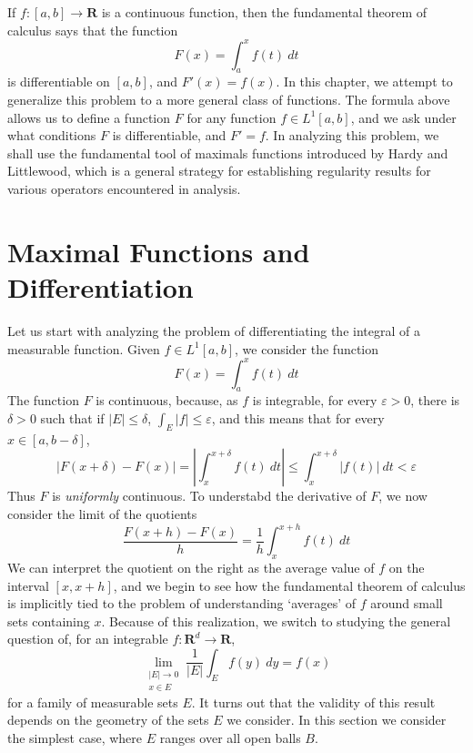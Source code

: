 %
%

If $f: [a,b] \to \mathbf{R}$ is a continuous function, then the fundamental theorem of calculus says that the function
%
\[ F(x) = \int_a^x f(t)\ dt \]
%
is differentiable on $[a,b]$, and $F'(x) = f(x)$. In this chapter, we attempt to generalize this problem to a more general class of functions. The formula above allows us to define a function $F$ for any function $f \in L^1[a,b]$, and we ask under what conditions $F$ is differentiable, and $F' = f$. In analyzing this problem, we shall use the fundamental tool of maximals functions introduced by Hardy and Littlewood, which is a general strategy for establishing regularity results for various operators encountered in analysis.

\section{Maximal Functions and Differentiation}

Let us start with analyzing the problem of differentiating the integral of a measurable function. Given $f \in L^1[a,b]$, we consider the function
%
\[ F(x) = \int_a^x f(t)\ dt \]
%
The function $F$ is continuous, because, as $f$ is integrable, for every $\varepsilon > 0$, there is $\delta > 0$ such that if $|E| \leq \delta$, $\int_E |f| \leq \varepsilon$, and this means that for every $x \in [a,b-\delta]$,
%
\[ |F(x + \delta) - F(x)| = \left| \int_{x}^{x+\delta} f(t)\ dt \right| \leq \int_x^{x+\delta} |f(t)|\ dt < \varepsilon \]
%
Thus $F$ is {\it uniformly} continuous. To understabd the derivative of $F$, we now consider the limit of the quotients
%
\[ \frac{F(x+h) - F(x)}{h} = \frac{1}{h} \int_x^{x+h} f(t)\ dt \]
%
We can interpret the quotient on the right as the average value of $f$ on the interval $[x,x+h]$, and we begin to see how the fundamental theorem of calculus is implicitly tied to the problem of understanding `averages' of $f$ around small sets containing $x$. Because of this realization, we switch to studying the general question of, for an integrable $f: \mathbf{R}^d \to \mathbf{R}$,
%
\[ \lim_{\substack{|E| \to 0\\x \in E}} \frac{1}{|E|} \int_E f(y)\ dy = f(x) \]
%
for a family of measurable sets $E$. It turns out that the validity of this result depends on the geometry of the sets $E$ we consider. In this section we consider the simplest case, where $E$ ranges over all open balls $B$.

